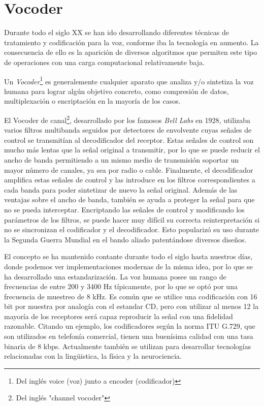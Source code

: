 \section{Vocoder}
Durante todo el siglo XX se han ido desarrollando diferentes técnicas de tratamiento y codificación para la voz, conforme iba la tecnología en aumento. La consecuencia de ello es la aparición de diversos algoritmos que permiten este tipo de operaciones con una carga computacional relativamente baja. 

Un \emph{Vocoder}\footnote{Del inglés voice (voz) junto a encoder (codificador)} es generalemente cualquier aparato que analiza y/o sintetiza la voz humana para lograr algún objetivo concreto, como compresión de datos, multiplexación o encriptación en la mayoría de los casos.

El Vocoder de canal\footnote{Del inglés "channel vocoder"}, desarrollado por los famosos \emph{Bell Labs} en 1928, utilizaba varios filtros multibanda seguidos por detectores de envolvente cuyas señales de control se transmitían al decodificador del receptor. Estas señales de control son mucho más lentas que la señal original a transmitir, por lo que se puede reducir el ancho de banda permitiendo a un mismo medio de transmisión soportar un mayor número de canales, ya sea por radio o cable. Finalmente, el decodificador amplifica estas señales de control y las introduce en los filtros correspondientes a cada banda para poder sintetizar de nuevo la señal original. Además de las ventajas sobre el ancho de banda, también se ayuda a proteger la señal para que no se pueda interceptar. Encriptando las señales de control y modificando los parámetros de los filtros, se puede hacer muy difícil su correcta reinterpretación si no se sincronizan el codificador y el decodificador. Esto popularizó su uso durante la Segunda Guerra Mundial en el bando aliado patentándose diversos diseños.

El concepto se ha mantenido contante durante todo el siglo hasta nuestros días, donde podemos ver implementaciones modernas de la misma idea, por lo que se ha desarrollado una estandarización. La voz humana posee un rango de frecuencias de entre 200 y 3400 Hz típicamente, por lo que se optó por una frecuencia de muestreo de 8 kHz. Es común que se utilice una codificación con 16 bit por muestra por analogía con el estandar CD, pero con utilizar al menos 12 la mayoría de los receptores será capaz reproducir la señal con una fidelidad razonable. Citando un ejemplo, los codificadores según la norma ITU G.729, que son utilizados en telefonía comercial, tienen una buenísima calidad con una tasa binaria de 8 kbps. Actualmente también se utilizan para desarrollar tecnologías relacionadas con la lingüistica, la física y la neurociencia.

